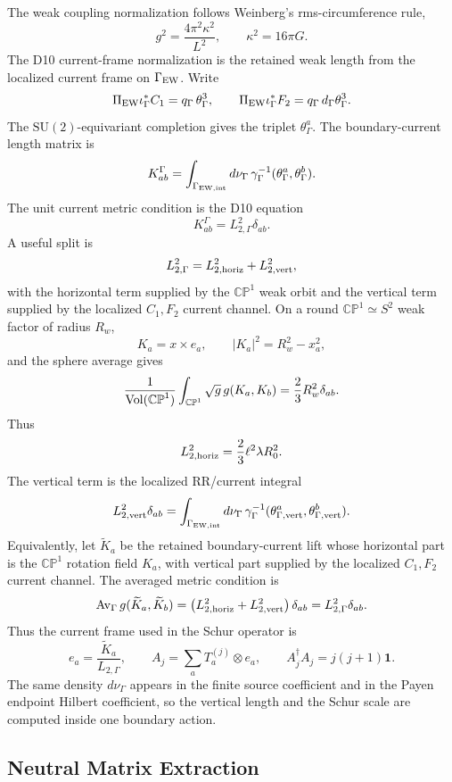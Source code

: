 \documentclass[11pt]{article}
\theoremstyle{definition}
\theoremstyle{remark}
\newcommand{\SU}{\mathrm{SU}}
\newcommand{\CP}{\mathbb{CP}}
\begin{document}
The weak coupling normalization follows Weinberg's rms-circumference rule,
\[
  g^2=\frac{4\pi^2\kappa^2}{L^2},
  \qquad
  \kappa^2=16\pi G.
\]
The D10 current-frame normalization is the retained weak length from the
localized current frame on \(\Gamma_{\rm EW}\).  Write
\[
  \Pi_{\rm EW}\iota_\Gamma^*C_1
  =
  q_\Gamma\,\theta_\Gamma^3,
  \qquad
  \Pi_{\rm EW}\iota_\Gamma^*F_2
  =
  q_\Gamma\,d_\Gamma\theta_\Gamma^3 .
\]
The \(\SU(2)\)-equivariant completion gives the triplet
\(\theta_\Gamma^a\).  The boundary-current length matrix is
\[
  K_{ab}^\Gamma
  =
  \int_{\Gamma_{\rm EW,int}}d\nu_\Gamma\,
  \gamma_\Gamma^{-1}(\theta_\Gamma^a,\theta_\Gamma^b).
\]
The unit current metric condition is the D10 equation
\[
  K_{ab}^\Gamma=L_{2,\Gamma}^2\delta_{ab}.
\]
A useful split is
\[
  L_{2,\Gamma}^2=L_{2,{\rm horiz}}^2+L_{2,{\rm vert}}^2,
\]
with the horizontal term supplied by the \(\CP^1\) weak orbit and the vertical
term supplied by the localized \(C_1,F_2\) current channel.  On a round
\(\CP^1\simeq S^2\) weak factor of radius \(R_w\),
\[
  K_a=x\times e_a,
  \qquad
  |K_a|^2=R_w^2-x_a^2,
\]
and the sphere average gives
\[
  \frac{1}{{\rm Vol}(\CP^1)}
  \int_{\CP^1}\sqrt g\,g(K_a,K_b)
  =
  \frac{2}{3}R_w^2\delta_{ab}.
\]
Thus
\[
  L_{2,{\rm horiz}}^2=\frac23\ell^2\lambda R_0^2.
\]
The vertical term is the localized RR/current integral
\[
  L_{2,{\rm vert}}^2\delta_{ab}
  =
  \int_{\Gamma_{\rm EW,int}}d\nu_\Gamma\,
  \gamma_\Gamma^{-1}(\theta_{\Gamma,{\rm vert}}^a,
  \theta_{\Gamma,{\rm vert}}^b).
\]
Equivalently, let \(\widetilde K_a\) be the retained boundary-current lift
whose horizontal part is the \(\CP^1\) rotation field \(K_a\), with vertical
part supplied by the localized \(C_1,F_2\) current channel.  The averaged
metric condition is
\[
  {\rm Av}_\Gamma\,g(\widetilde K_a,\widetilde K_b)
  =
  \left(L_{2,{\rm horiz}}^2+L_{2,{\rm vert}}^2\right)\delta_{ab}
  =
  L_{2,\Gamma}^2\delta_{ab}.
\]
Thus the current frame used in the Schur operator is
\[
  e_a=\frac{\widetilde K_a}{L_{2,\Gamma}},
  \qquad
  A_j=\sum_aT_a^{(j)}\otimes e_a,
  \qquad
  A_j^\dagger A_j=j(j+1)\bm1 .
\]
The same density \(d\nu_\Gamma\) appears in the finite source coefficient
and in the Payen endpoint Hilbert coefficient, so the vertical length and the
Schur scale are computed inside one boundary action.

\subsection{Neutral Matrix Extraction}
\end{document}
